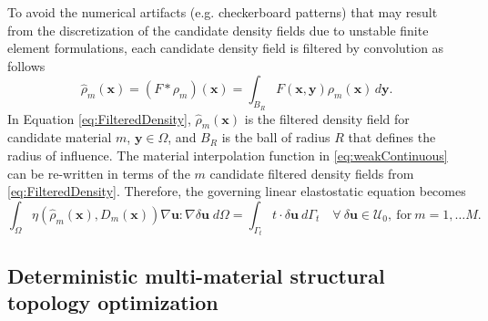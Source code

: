 To avoid the numerical artifacts (e.g. checkerboard patterns) \cite{sigmund1998,Sigmund2007} that may result from the discretization of the candidate density fields due to unstable finite element formulations, each candidate density field is filtered by convolution as follows
\begin{equation}
\label{eq:FilteredDensity}
\hat{\rho}_m(\bm x)=(F\ast\rho_m)(\bm x)=\int_{B_R}F(\bm x,\bm y)\rho_m(\bm x)\, d\bm y.
\end{equation} 
In Equation \eqref{eq:FilteredDensity}, $\hat{\rho}_m(\bm x)$ is the filtered density field for candidate material $m$, $\bm y\in\Omega$, and $B_R$ is the ball of radius $R$ that defines the radius of influence. The material interpolation function in \eqref{eq:weakContinuous} can be re-written in terms of the $m$ candidate filtered density fields from \eqref{eq:FilteredDensity}. Therefore, the governing linear elastostatic equation becomes
\begin{equation}
\label{eq:weakContinuousFiltered}
\int_{\Omega}\eta(\hat{\rho}_m(\bm x),D_m(\bm x))\nabla\bm u\colon\nabla\delta\bm u\; d\Omega=\int_{\Gamma_{t}} t\cdot\delta\bm{u}\ d\Gamma_t\quad\forall\ \delta\bm u\in\mathcal{U}_0,\ \mbox{for}\ m=1,\dots{M}.
\end{equation}

\subsection{Deterministic multi-material structural topology optimization}

